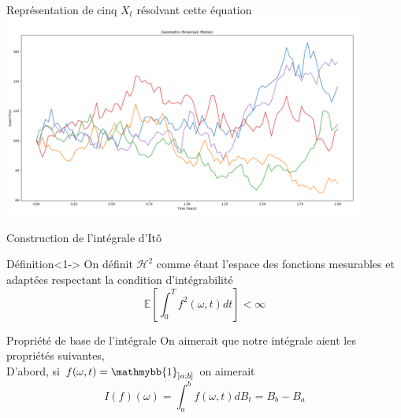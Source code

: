 \documentclass{beamer}
\newcommand{\1}{\mathmybb{1}}
\begin{document}

 \begin{frame}{Représentation de cinq $X_{t}$ résolvant cette équation}
   \includegraphics[width=12cm]{imgs/bs5.png}
 \end{frame}
 \begin{frame}{Construction de l'intégrale d'Itô}
   \begin{block}{Définition}<1->
     On définit $\mathcal{H}^{2}$ comme étant l'espace des fonctions mesurables et adaptées respectant la condition d'intégrabilité \\
     \[
       \mathbb{E}\left[\int_{0}^{T}f^{2}(\omega, t) dt \right] < \infty
     \]
   \end{block}
    \begin{block}{Propriété de base de l'intégrale}
     On aimerait que notre intégrale aient les propriétés suivantes, \\
D'abord, si $ f(\omega, t) = \1_{\left] a; b \right]} $ on aimerait
     \[
       I(f)(\omega) = \int_{a}^{b}f(\omega, t) dB_{t} = B_{b} - B_{a}
     \]
   \end{block}

 \end{frame}
 
\end{document}
